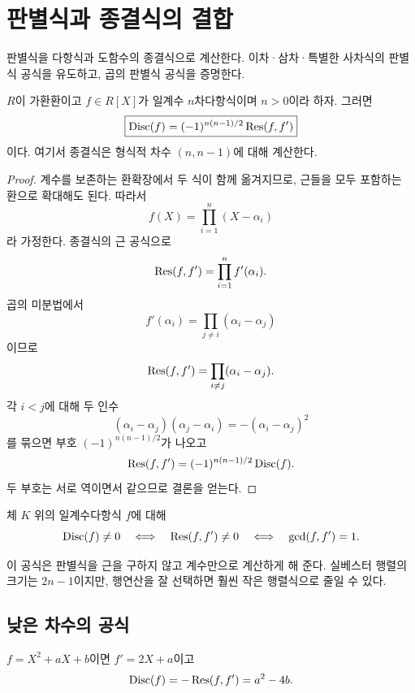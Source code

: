\clearpage
\section{판별식과 종결식의 결합}
\label{sec:discriminant-resultant-relation}

\begin{learninggoal}
판별식을 다항식과 도함수의 종결식으로 계산한다. 이차·삼차·특별한 사차식의 판별식 공식을 유도하고, 곱의 판별식 공식을 증명한다.
\end{learninggoal}

\begin{theorem}
\label{thm:discriminant-resultant}
$R$이 가환환이고 $f\in R[X]$가 일계수 $n$차다항식이며 $n>0$이라 하자. 그러면
\[
  \boxed{
  \operatorname{Disc}(f)
  =(-1)^{n(n-1)/2}\operatorname{Res}(f,f')
  }
\]
이다. 여기서 종결식은 형식적 차수 $(n,n-1)$에 대해 계산한다.
\end{theorem}

\begin{proof}
계수를 보존하는 환확장에서 두 식이 함께 옮겨지므로, 근들을 모두 포함하는 환으로 확대해도 된다. 따라서
\[
  f(X)=\prod_{i=1}^n(X-\alpha_i)
\]
라 가정한다. 종결식의 근 공식으로
\[
  \operatorname{Res}(f,f')=\prod_{i=1}^n f'(\alpha_i).
\]
곱의 미분법에서
\[
  f'(\alpha_i)=\prod_{j\ne i}(\alpha_i-\alpha_j)
\]
이므로
\[
  \operatorname{Res}(f,f')
  =\prod_{i\ne j}(\alpha_i-\alpha_j).
\]
각 $i<j$에 대해 두 인수
\[
  (\alpha_i-\alpha_j)(\alpha_j-\alpha_i)
  =-(\alpha_i-\alpha_j)^2
\]
를 묶으면 부호 $(-1)^{n(n-1)/2}$가 나오고
\[
  \operatorname{Res}(f,f')
  =(-1)^{n(n-1)/2}\operatorname{Disc}(f).
\]
두 부호는 서로 역이면서 같으므로 결론을 얻는다.
\end{proof}

\begin{corollary}
체 $K$ 위의 일계수다항식 $f$에 대해
\[
  \operatorname{Disc}(f)\ne0
  \quad\Longleftrightarrow\quad
  \operatorname{Res}(f,f')\ne0
  \quad\Longleftrightarrow\quad
  \gcd(f,f')=1.
\]
\end{corollary}

이 공식은 판별식을 근을 구하지 않고 계수만으로 계산하게 해 준다. 실베스터 행렬의 크기는 $2n-1$이지만, 행연산을 잘 선택하면 훨씬 작은 행렬식으로 줄일 수 있다.

\subsection{낮은 차수의 공식}

\begin{example}[이차식]
$f=X^2+aX+b$이면 $f'=2X+a$이고
\[
  \operatorname{Disc}(f)
  =-\operatorname{Res}(f,f')
  =a^2-4b.
\]
\end{example}

